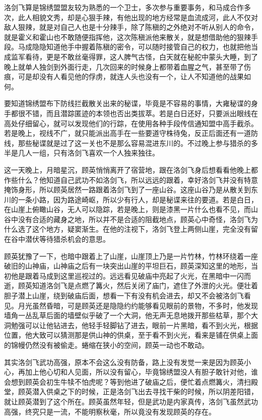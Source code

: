 洛剑飞算是锦绣盟盟友较为熟悉的一个卫士，多次参与重要事务，和马成合作多次，此人相貌文秀，却是心狠手辣，有他出现的地方经常是血流成河，此人不仅对敌人狠辣，就是对自己人也是十分辣手，除了陈稹的之外绝对不听从别人的命令，就是霍义和霍山也不敢随便指挥他，这次陈稹派他来散关，就是想借助他的狠辣手段。马成隐隐知道他手中握着陈稹的密令，可以随时接管自己的权力，也就把他当成监军看待，更是不敢丝毫得罪，这人脾气古怪，白天就在秘舵中蒙头大睡，到了晚上就单人独剑到外面行走，几次回来的时候身上都带着血腥之气，甚至带了伤痕，可是却没有人看见他的俘虏，就连人头也没有一个，让人不知道他的战果如何。

要知道锦绣盟布下防线拦截散关出来的秘谍，毕竟是不容易的事情，大雍秘谍的身手都很不错，而且潜踪匿迹的本领也否出类拔萃。若是白日还好，只要派出眼线在高处仔细留心，就可以发现他们的行踪，在使用各种手段传信通知盟中高手截杀。若是晚上，视线不广，就只能派出高手在一些要道守株待兔，反正后面还有一道防线，那些秘谍就是过了这一关也不是那么容易混进东川的。不过晚上参与猎杀的多半是几人一组，只有洛剑飞喜欢一个人独来独往。

这一天晚上，月暗星沉，顾英悄悄离开了宿营地，跟在洛剑飞身后想看看他晚上都作些什么？他知道自己武功不如洛剑飞，所以远远的跟着，幸好洛剑飞并没有特意掩饰身形，所以顾英居然一路跟着洛剑飞到了一座山谷。这座山谷乃是从散关到东川的一条小路，因为路途崎岖，所以少有行人，却是秘谍来往的要道。若是白日，在山崖上俯瞰山谷，无人可以隐踪，若是晚上，则是漆黑一片什么也看不见，而山谷中没有合适的藏身之地，所以并不是合适的阻截地点，顾英心中奇怪，洛剑飞为什么选了这个地方，疑窦渐生。在他的注视下，洛剑飞登上两侧山崖，完全没有留在谷中潜伏等待猎杀机会的意思。

顾英犹豫了一下，也暗中跟着上了山崖，山崖顶上乃是一片竹林，竹林环绕着一座破旧的山神庙，山神庙之后有一块突出山崖的平坦巨石，顾英深知这里的地形，当初他是跟着马成到这里巡视过的。远远看见破庙中亮起了火光，在黑暗中一闪而逝，顾英知道洛剑飞是点燃了篝火，然后关闭了庙门，遮住了外泄的火光。便壮着胆子潜上山崖，绕到破庙后面，想看一下有没有机会进去，却又不会被洛剑飞看见。月光虽然昏暗，可是顾英还是隐隐约约能够看见眼前的景物，不多时，他发现墙角一丛乱草后面的墙壁似乎破了一个大洞，他无声无息地拨开那些枯草，那个大洞勉强可以让他钻进去，他轻手轻脚钻了进去，眼前一片黑暗，看不到火光，根据位置，他大致可以猜测那是供山神的供桌，至于看不到火光，看来是铺在供桌上面的锦幔仍然没有被偷走。蜷缩在狭小的空间，顾英一动也不敢动。

其实洛剑飞武功高强，原本不会这么没有防备，路上没有发觉一来是因为顾英小心，再加上他心切和人见面，所以没有留心，毕竟锦绣盟没人有胆子敢针对他，谁会想到顾英会初生牛犊不怕虎呢？等到他进了破庙之后，便忙着点燃篝火，清扫殿堂，顾英潜入供桌之下的时候，正是洛剑飞出去寻找干柴的时候，所以阴差阳错，就让顾英潜到了这个所在。顾英虽然年轻，但是武功是内家真传，洛剑飞虽然武功高强，终究只是一流，不能明察秋毫，所以竟没有发现顾英的存在。

